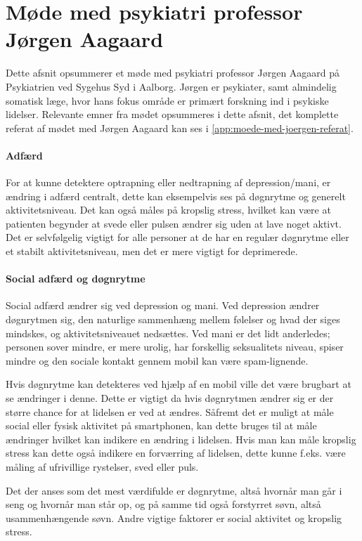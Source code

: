 \section{Møde med psykiatri professor Jørgen Aagaard}\label{sec:moede-med-joergen}
Dette afsnit opsummerer et møde med psykiatri professor Jørgen Aagaard på Psykiatrien ved Sygehus Syd i Aalborg. 
Jørgen er psykiater, samt almindelig somatisk læge, hvor hans fokus område er primært forskning ind i psykiske lidelser.
Relevante emner fra mødet opsummeres i dette afsnit, det komplette referat af mødet med Jørgen Aagaard kan ses i \cref{app:moede-med-joergen-referat}.

\paragraph{Adfærd}
For at kunne detektere optrapning eller nedtrapning af depression/mani, er ændring i adfærd centralt, dette kan eksempelvis ses på døgnrytme og generelt aktivitetsniveau. 
Det kan også måles på kropslig stress, hvilket kan være at patienten begynder at svede eller pulsen ændrer sig uden at lave noget aktivt. 
Det er selvfølgelig vigtigt for alle personer at de har en regulær døgnrytme eller et stabilt aktivitetsniveau, men det er mere vigtigt for deprimerede.

\paragraph{Social adfærd og døgnrytme}
Social adfærd ændrer sig ved depression og mani.
Ved depression ændrer døgnrytmen sig, den naturlige sammenhæng mellem følelser og hvad der siges mindskes, og aktivitetsniveauet nedsættes.
Ved mani er det lidt anderledes; personen sover mindre, er mere urolig, har forskellig seksualitets niveau, spiser mindre og den sociale kontakt gennem mobil kan være spam-lignende. 

Hvis døgnrytme kan detekteres ved hjælp af en mobil ville det være brugbart at se ændringer i denne.
Dette er vigtigt da hvis døgnrytmen ændrer sig er der større chance for at lidelsen er ved at ændres.
Såfremt det er muligt at måle social eller fysisk aktivitet på smartphonen, kan dette bruges til at måle ændringer hvilket kan indikere en ændring i lidelsen.
Hvis man kan måle kropslig stress kan dette også indikere en forværring af lidelsen, dette kunne f.eks. være måling af ufrivillige rystelser, sved eller puls. 

Det der anses som det mest værdifulde er døgnrytme, altså hvornår man går i seng og hvornår man står op, og på samme tid også forstyrret søvn, altså usammenhængende søvn. 
Andre vigtige faktorer er social aktivitet og kropslig stress.

